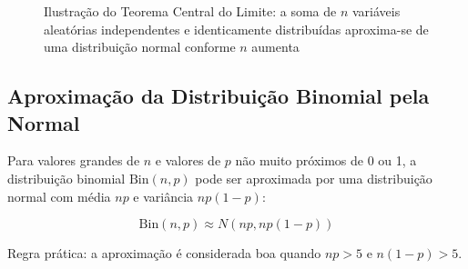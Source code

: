 \documentclass[a4paper,12pt]{article}
\begin{document}
\begin{figure}[H]
\centering
{}
\caption{Ilustração do Teorema Central do Limite: a soma de $n$ variáveis aleatórias independentes e identicamente distribuídas aproxima-se de uma distribuição normal conforme $n$ aumenta}
\end{figure}

\subsection{Aproximação da Distribuição Binomial pela Normal}

Para valores grandes de $n$ e valores de $p$ não muito próximos de 0 ou 1, a distribuição binomial $\text{Bin}(n, p)$ pode ser aproximada por uma distribuição normal com média $np$ e variância $np(1-p)$:

\begin{equation}
\text{Bin}(n, p) \approx N(np, np(1-p))
\end{equation}

Regra prática: a aproximação é considerada boa quando $np > 5$ e $n(1-p) > 5$.
\end{document}
